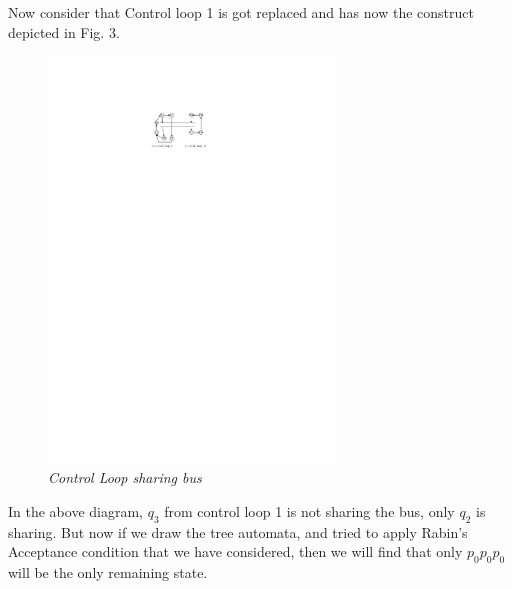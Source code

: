 \documentclass[conference]{IEEEtran}
\begin{document}
Now consider that Control loop 1 is got replaced and has now the construct depicted in Fig. 3.

\begin{figure}[h]
\begin{center}
\includegraphics[width=3.0in]{diagram_replaced.pdf}
\end{center}
\vspace{-0.1in}
\caption{{\em Control Loop sharing bus}}
\label{fig:automaton}
\end{figure}


In the above diagram, $q_3$ from control loop 1 is not sharing the bus, only $q_2$ is 
sharing. But now if we draw the tree automata, and tried to apply Rabin's Acceptance
condition that we have considered, then we will find that only $p_0p_0p_0$ will be 
the only remaining state. 
\end{document}

